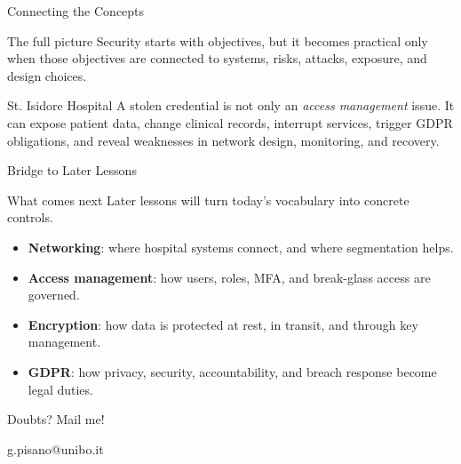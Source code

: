 \documentclass[presentation]{beamer}
\begin{document}
\begin{frame}[c]{Connecting the Concepts}
\begin{block}{The full picture}
Security starts with objectives, but it becomes practical only when those objectives are connected
to systems, risks, attacks, exposure, and design choices.
\end{block}

\begin{exampleblock}{St. Isidore Hospital}
A stolen credential is not only an \textit{access management} issue. It can expose patient data,
change clinical records, interrupt services, trigger GDPR obligations, and reveal weaknesses in
network design, monitoring, and recovery.
\end{exampleblock}
\end{frame}

\begin{frame}[c]{Bridge to Later Lessons}
\begin{block}{What comes next}
Later lessons will turn today's vocabulary into concrete controls.
\end{block}

\begin{itemize}
    \item \textbf{Networking}: where hospital systems connect, and where segmentation helps.
    \item \textbf{Access management}: how users, roles, MFA, and break-glass access are governed.
    \item \textbf{Encryption}: how data is protected at rest, in transit, and through key management.
    \item \textbf{GDPR}: how privacy, security, accountability, and breach response become legal duties.
\end{itemize}
\end{frame}

\begin{frame}[c]{Doubts? Mail me!}
\begin{center}
\Large g.pisano@unibo.it
\end{center}
\end{frame}

\begin{frame}[allowframebreaks]
\titlepage
\end{frame}

\section*{\refname}

\begin{frame}{\refname}
	\scriptsize
	
	
\end{frame}
\end{document}
